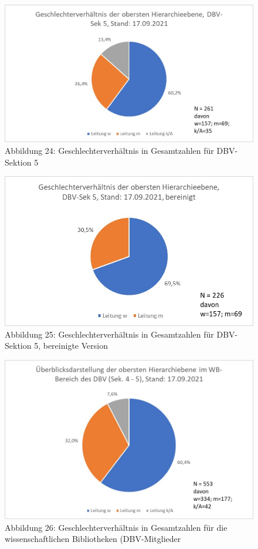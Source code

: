 \documentclass[a4paper,
fontsize=11pt,
oneside,
numbers=noperiodatend,
parskip=half-,
bibliography=totoc,
final
]{scrartcl}
\begin{document}
\begin{figure}
\centering
\includegraphics{img/Abb_24_DBV-Sek5_gesamt.jpg}
\caption{Abbildung 24: Geschlechterverhältnis in Gesamtzahlen für
DBV-Sektion 5}
\end{figure}

\begin{figure}
\centering
\includegraphics{img/Abb_25_DBV-Sek5_gesamt_bereinigt.jpg}
\caption{Abbildung 25: Geschlechterverhältnis in Gesamtzahlen für
DBV-Sektion 5, bereinigte Version}
\end{figure}

\begin{figure}
\centering
\includegraphics{img/Abb_26_DBV-Sek4-5_gesamt.jpg}
\caption{Abbildung 26: Geschlechterverhältnis in Gesamtzahlen für die
wissenschaftlichen Bibliotheken (DBV-Mitglieder}
\end{figure}
\end{document}
